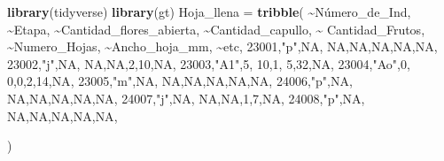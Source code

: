 \documentclass[
]{book}
\newenvironment{Shaded}{\begin{snugshade}}{\end{snugshade}}
\newcommand{\ConstantTok}[1]{\textcolor[rgb]{0.56,0.35,0.01}{#1}}
\newcommand{\DecValTok}[1]{\textcolor[rgb]{0.00,0.00,0.81}{#1}}
\newcommand{\FunctionTok}[1]{\textcolor[rgb]{0.13,0.29,0.53}{\textbf{#1}}}
\newcommand{\NormalTok}[1]{#1}
\newcommand{\OtherTok}[1]{\textcolor[rgb]{0.56,0.35,0.01}{#1}}
\newcommand{\SpecialCharTok}[1]{\textcolor[rgb]{0.81,0.36,0.00}{\textbf{#1}}}
\newcommand{\StringTok}[1]{\textcolor[rgb]{0.31,0.60,0.02}{#1}}
\theoremstyle{definition}
\theoremstyle{definition}
\theoremstyle{definition}
\theoremstyle{definition}
\theoremstyle{remark}
\begin{document}
\begin{Shaded}
\begin{Highlighting}[]
\FunctionTok{library}\NormalTok{(tidyverse)}
\FunctionTok{library}\NormalTok{(gt)}
\NormalTok{Hoja\_llena }\OtherTok{=} \FunctionTok{tribble}\NormalTok{(}
  \SpecialCharTok{\textasciitilde{}}\NormalTok{Número\_de\_Ind, }\SpecialCharTok{\textasciitilde{}}\NormalTok{Etapa, }\SpecialCharTok{\textasciitilde{}}\NormalTok{Cantidad\_flores\_abierta, }\SpecialCharTok{\textasciitilde{}}\NormalTok{Cantidad\_capullo, }\SpecialCharTok{\textasciitilde{}}\NormalTok{ Cantidad\_Frutos, }\SpecialCharTok{\textasciitilde{}}\NormalTok{Numero\_Hojas, }\SpecialCharTok{\textasciitilde{}}\NormalTok{Ancho\_hoja\_mm, }\SpecialCharTok{\textasciitilde{}}\NormalTok{etc,}
  \DecValTok{23001}\NormalTok{,}\StringTok{"p"}\NormalTok{,}\ConstantTok{NA}\NormalTok{, }\ConstantTok{NA}\NormalTok{,}\ConstantTok{NA}\NormalTok{,}\ConstantTok{NA}\NormalTok{,}\ConstantTok{NA}\NormalTok{,}\ConstantTok{NA}\NormalTok{,}
  \DecValTok{23002}\NormalTok{,}\StringTok{"j"}\NormalTok{,}\ConstantTok{NA}\NormalTok{, }\ConstantTok{NA}\NormalTok{,}\ConstantTok{NA}\NormalTok{,}\DecValTok{2}\NormalTok{,}\DecValTok{10}\NormalTok{,}\ConstantTok{NA}\NormalTok{,}
  \DecValTok{23003}\NormalTok{,}\StringTok{"A1"}\NormalTok{,}\DecValTok{5}\NormalTok{, }\DecValTok{10}\NormalTok{,}\DecValTok{1}\NormalTok{, }\DecValTok{5}\NormalTok{,}\DecValTok{32}\NormalTok{,}\ConstantTok{NA}\NormalTok{,}
  \DecValTok{23004}\NormalTok{,}\StringTok{"Ao"}\NormalTok{,}\DecValTok{0}\NormalTok{, }\DecValTok{0}\NormalTok{,}\DecValTok{0}\NormalTok{,}\DecValTok{2}\NormalTok{,}\DecValTok{14}\NormalTok{,}\ConstantTok{NA}\NormalTok{,}
  \DecValTok{23005}\NormalTok{,}\StringTok{"m"}\NormalTok{,}\ConstantTok{NA}\NormalTok{, }\ConstantTok{NA}\NormalTok{,}\ConstantTok{NA}\NormalTok{,}\ConstantTok{NA}\NormalTok{,}\ConstantTok{NA}\NormalTok{,}\ConstantTok{NA}\NormalTok{,}
  \DecValTok{24006}\NormalTok{,}\StringTok{"p"}\NormalTok{,}\ConstantTok{NA}\NormalTok{, }\ConstantTok{NA}\NormalTok{,}\ConstantTok{NA}\NormalTok{,}\ConstantTok{NA}\NormalTok{,}\ConstantTok{NA}\NormalTok{,}\ConstantTok{NA}\NormalTok{,}
  \DecValTok{24007}\NormalTok{,}\StringTok{"j"}\NormalTok{,}\ConstantTok{NA}\NormalTok{, }\ConstantTok{NA}\NormalTok{,}\ConstantTok{NA}\NormalTok{,}\DecValTok{1}\NormalTok{,}\DecValTok{7}\NormalTok{,}\ConstantTok{NA}\NormalTok{,}
  \DecValTok{24008}\NormalTok{,}\StringTok{"p"}\NormalTok{,}\ConstantTok{NA}\NormalTok{, }\ConstantTok{NA}\NormalTok{,}\ConstantTok{NA}\NormalTok{,}\ConstantTok{NA}\NormalTok{,}\ConstantTok{NA}\NormalTok{,}\ConstantTok{NA}\NormalTok{,}
  
\NormalTok{)}
\end{Highlighting}
\end{Shaded}
\end{document}

